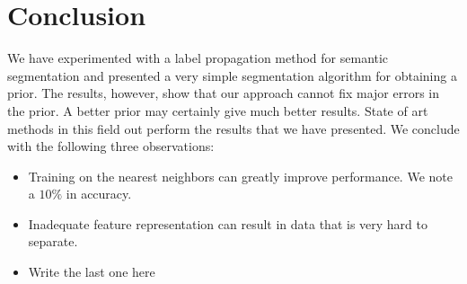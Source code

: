 \documentclass{article} %
\begin{document}
\section{Conclusion}
\label{sec:Conclusion}
We have experimented with a label propagation method for semantic segmentation and presented a very simple segmentation algorithm for obtaining a prior. The results, however, show that our approach cannot fix major errors in the prior. A better prior may certainly give much better results. State of art methods in this field out perform the results that we have presented. We conclude with the following three observations:
\begin{itemize}
\item Training on the nearest neighbors can greatly improve performance. We note a $10\%$ in accuracy.
\item Inadequate feature representation can result in data that is very hard to separate.
\item Write the last one here
\end{itemize}



\end{document}
